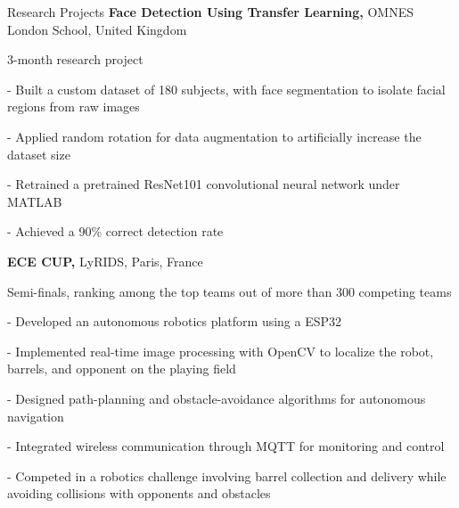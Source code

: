 \begin{rubric}{Research Projects}
\entry*[2022]
\textbf{Face Detection Using Transfer Learning,} OMNES London School, United Kingdom\par
3-month research project\par
- Built a custom dataset of 180 subjects, with face segmentation to isolate facial regions from raw images\par
- Applied random rotation for data augmentation to artificially increase the dataset size\par
- Retrained a pretrained ResNet101 convolutional neural network under MATLAB\par
- Achieved a 90\% correct detection rate

\entry*[2020 -- 2022]
\textbf{ECE CUP,} LyRIDS, Paris, France\par
Semi-finals, ranking among the top teams out of more than 300 competing teams\par
- Developed an autonomous robotics platform using a ESP32\par
- Implemented real-time image processing with OpenCV to localize the robot, barrels, and opponent on the playing field\par
- Designed path-planning and obstacle-avoidance algorithms for autonomous navigation\par
- Integrated wireless communication through MQTT for monitoring and control\par
- Competed in a robotics challenge involving barrel collection and delivery while avoiding collisions with opponents and obstacles
\end{rubric}